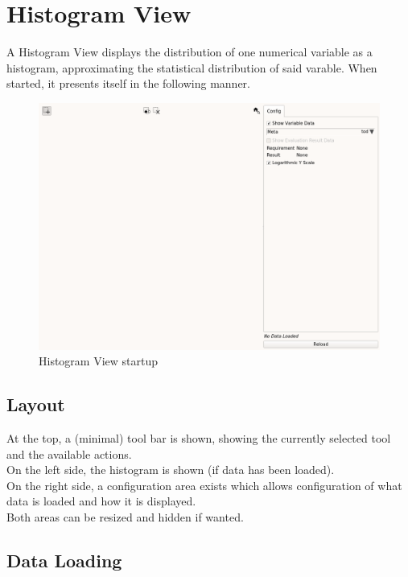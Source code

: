 \chapter{Histogram View}
\label{sec:histo_view}

A Histogram View displays the distribution of one numerical variable as a histogram, approximating the statistical distribution of said varable. When started, it presents itself in the following manner.

\begin{figure}[H]
    \hspace*{-2cm}
    \includegraphics[width=18cm,frame]{../screenshots/histogram_start.png}
  \caption{Histogram View startup}
\end{figure}

\section{Layout}

At the top, a (minimal) tool bar is shown, showing the currently selected tool and the available actions. \\

On the left side, the histogram is shown (if data has been loaded). \\

On the right side, a configuration area exists which allows configuration of what data is loaded and how it is displayed. \\

Both areas can be resized and hidden if wanted.

\section{Data Loading}

